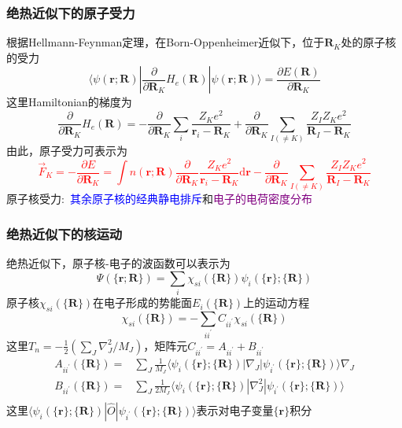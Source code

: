 \frame
{
	\frametitle{绝热近似下的原子受力}
	根据\textrm{Hellmann-Feynman}定理，在\textrm{Born-Oppenheimer}近似下，位于$\mathbf{R}_K$处的原子核的受力
	\begin{displaymath}
		\langle\psi(\mathbf{r};\mathbf{R})|\dfrac{\partial}{\partial{\mathbf{R}_K}}H_e(\mathbf{R})|\psi(\mathbf{r};\mathbf{R})\rangle=\dfrac{\partial E(\mathbf{R})}{\partial\mathbf{R}_K}
	\end{displaymath}
	这里\textrm{Hamiltonian}的梯度为
	\begin{displaymath}
		\dfrac{\partial}{\partial{\mathbf{R}_K}}H_e(\mathbf{R})=-\dfrac{\partial}{\partial{\mathbf{R}_K}}\sum_i\dfrac{Z_Ke^2}{\mathbf{r}_i-\mathbf{R}_K}+\dfrac{\partial}{\partial{\mathbf{R}_K}}\sum_{I(\neq K)}\dfrac{Z_IZ_Ke^2}{\mathbf{R}_I-\mathbf{R}_K}
	\end{displaymath}
	由此，原子受力可表示为
	\textcolor{red}{
	\begin{displaymath}
		\vec F_K=-\dfrac{\partial E}{\partial\mathbf{R}_K}=\int n(\mathbf{r};\mathbf{R})\dfrac{\partial}{\partial{\mathbf{R}_K}}\dfrac{Z_Ke^2}{\mathbf{r}_i-\mathbf{R}_K}\mathrm{d}\mathbf{r}-\dfrac{\partial}{\partial{\mathbf{R}_K}}\sum_{I(\neq K)}\dfrac{Z_IZ_Ke^2}{\mathbf{R}_I-\mathbf{R}_K}
	\end{displaymath}}
	原子核受力:~\textcolor{blue}{其余原子核的经典静电排斥}和\textcolor{purple}{电子的电荷密度分布}
}

\frame
{
	\frametitle{绝热近似下的核运动}
	绝热近似下，原子核-电子的波函数可以表示为
	\begin{displaymath}
		\Psi(\{\mathbf{r};\mathbf{R}\})=\sum_i\chi_{si}(\{\mathbf{R}\})\psi_i(\{\mathbf{r}\};\{\mathbf{R}\})
	\end{displaymath}
	原子核$\chi_{si}(\{\mathbf{R}\})$在电子形成的势能面$E_i(\{\mathbf{R}\})$上的运动方程
	\begin{displaymath}
		[T_N+E_i(\{\mathbf{R}\})-E_s]\chi_{si}(\{\mathbf{R}\})=-\sum_{ii^{\prime}}C_{ii^{\prime}}\chi_{si}(\{\mathbf{R}\})
	\end{displaymath}
	这里$T_n=-\frac12(\sum\limits_J\nabla_J^2/M_J)$，矩阵元$C_{ii^{\prime}}=A_{ii^{\prime}}+B_{ii^{\prime}}$
	\begin{displaymath}
		\begin{aligned}
			A_{ii^{\prime}}(\{\mathbf{R}\})=&\sum_J\frac1{M_J}\langle\psi_i(\{\mathbf{r}\};\{\mathbf{R}\})|\nabla_J|\psi_{i^{\prime}}(\{\mathbf{r}\};\{\mathbf{R}\})\rangle\nabla_J\\
			B_{ii^{\prime}}(\{\mathbf{R}\})=&\sum_J\frac1{2M_J}\langle\psi_i(\{\mathbf{r}\};\{\mathbf{R}\})|\nabla_J^2|\psi_{i^{\prime}}(\{\mathbf{r}\};\{\mathbf{R}\})\rangle\\
		\end{aligned}
	\end{displaymath}
	这里$\langle\psi_i(\{\mathbf{r}\};\{\mathbf{R}\})|\hat O|\psi_{i^{\prime}}(\{\mathbf{r}\};\{\mathbf{R}\})\rangle$表示对电子变量$\{\mathbf{r}\}$积分
}

